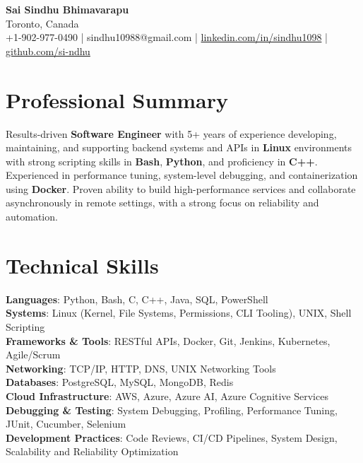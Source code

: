 \documentclass[letterpaper,11pt]{article}
\begin{document}
\begin{center}
  {\Large \textbf{Sai Sindhu Bhimavarapu}} \\
  Toronto, Canada \\
  +1-902-977-0490 \enspace | \enspace sindhu10988@gmail.com \enspace | \enspace \href{https://www.linkedin.com/in/sindhu1098/}{linkedin.com/in/sindhu1098} \enspace | \enspace \href{https://github.com/si-ndhu}{github.com/si-ndhu}
\end{center}

\section{Professional Summary}
  \begin{itemize}[leftmargin=0.15in, label={}]
    \small{\item{
     Results-driven \textbf{Software Engineer} with 5+ years of experience developing, maintaining, and supporting backend systems and APIs in \textbf{Linux} environments with strong scripting skills in \textbf{Bash}, \textbf{Python}, and proficiency in \textbf{C++}. Experienced in performance tuning, system-level debugging, and containerization using \textbf{Docker}. Proven ability to build high-performance services and collaborate asynchronously in remote settings, with a strong focus on reliability and automation.
    }}
  \end{itemize}
\vspace{-16pt}

\section{Technical Skills}
 \begin{itemize}[leftmargin=0.15in, label={}]
    \small{\item{
     \textbf{Languages}: Python, Bash, C, C++, Java, SQL, PowerShell \\
     \textbf{Systems}: Linux (Kernel, File Systems, Permissions, CLI Tooling), UNIX, Shell Scripting \\
     \textbf{Frameworks \& Tools}: RESTful APIs, Docker, Git, Jenkins, Kubernetes, Agile/Scrum \\
     \textbf{Networking}: TCP/IP, HTTP, DNS, UNIX Networking Tools \\
     \textbf{Databases}: PostgreSQL, MySQL, MongoDB, Redis \\
     \textbf{Cloud Infrastructure}: AWS, Azure, Azure AI, Azure Cognitive Services \\
     \textbf{Debugging \& Testing}: System Debugging, Profiling, Performance Tuning, JUnit, Cucumber, Selenium \\
     \textbf{Development Practices}: Code Reviews, CI/CD Pipelines, System Design, Scalability and Reliability Optimization
    }}
 \end{itemize}
\vspace{-16pt}
\end{document}
